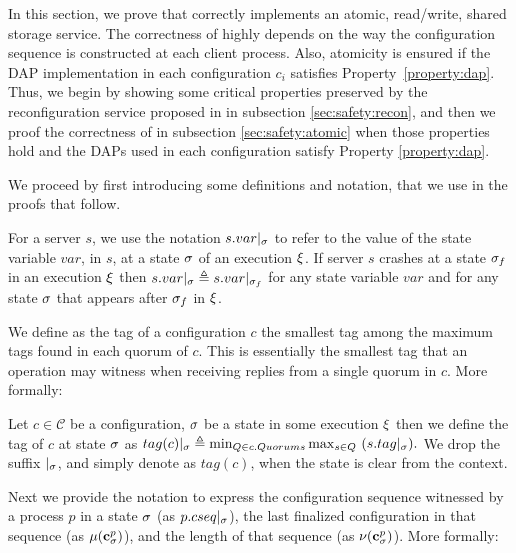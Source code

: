 In this section, we prove that \ares{} correctly implements an atomic, read/write, shared storage service. 
The correctness of \ares{} highly depends on the way the configuration 
sequence is constructed at each client process.
Also, atomicity is ensured if the DAP implementation in each configuration $c_i$
satisfies Property~\ref{property:dap}.
Thus, we begin by showing some critical properties preserved by the reconfiguration service proposed in \ares{} in subsection \ref{sec:safety:recon}, and then we proof
the correctness of \ares{} in subsection \ref{sec:safety:atomic} 
when those properties hold and the DAPs used in 
each configuration satisfy Property \ref{property:dap}.


We proceed by first introducing some definitions and notation, that we use in the proofs that follow. 

	For a server $s$, we use the notation $s.var|_{\sigma}$ to refer to the value of the state variable $var$, in $s$, at a state $\sigma$ of an  execution $\EX$. 
	If server  $s$ crashes at a state $\sigma_f$ in an execution $\EX$ then $s.var|_{\sigma}\triangleq s.var|_{\sigma_f}$ for any state variable $var$ and for 
	any state $\sigma$ that appears after $\sigma_f$ in $\EX$. 

    We define as the tag of a configuration $c$ the smallest tag among the maximum tags found in each quorum of $c$. This is essentially the smallest tag that an operation may witness when receiving replies from a single quorum in $c$. More formally:

	\begin{definition}  Let  $c \in \mathcal{C}$ be a configuration, $\sigma$ be a state in some execution $\EX$ then 
		we define the tag of $c$ at state $\sigma$ as  
		$ tag(c)|_{\sigma} \triangleq \min_{Q \in c.Quorums} \max_{s \in Q}~(s.tag|_{\sigma}).$
		We  drop the suffix $|_\sigma$, and simply denote as $tag(c)$,  when the state  is clear from the context.
	\end{definition}
	Next we provide the notation to express the configuration sequence witnessed by a process $p$ in a state $\sigma$ (as $ p.cseq|_{\sigma}$), the last finalized configuration in that sequence
	(as $\mu(\mathbf{c}^{p}_{\sigma})$), and the length of that sequence (as $\nu(\mathbf{c}^{p}_{\sigma})$). More formally:
	
